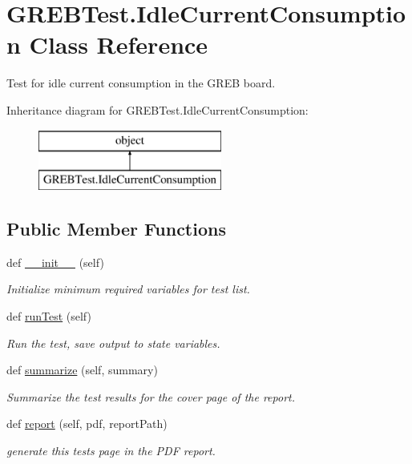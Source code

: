 \hypertarget{class_g_r_e_b_test_1_1_idle_current_consumption}{}\section{G\+R\+E\+B\+Test.\+Idle\+Current\+Consumption Class Reference}
\label{class_g_r_e_b_test_1_1_idle_current_consumption}


Test for idle current consumption in the G\+R\+EB board.  


Inheritance diagram for G\+R\+E\+B\+Test.\+Idle\+Current\+Consumption\+:\begin{figure}[H]
\begin{center}
\leavevmode
\includegraphics[height=2.000000cm]{class_g_r_e_b_test_1_1_idle_current_consumption}
\end{center}
\end{figure}
\subsection*{Public Member Functions}
\begin{DoxyCompactItemize}
\item 
def \hyperlink{class_g_r_e_b_test_1_1_idle_current_consumption_a69031fdeff95bec4109a9375b822693d}{\+\_\+\+\_\+init\+\_\+\+\_\+} (self)
\begin{DoxyCompactList}\small\item\em Initialize minimum required variables for test list. \end{DoxyCompactList}\item 
def \hyperlink{class_g_r_e_b_test_1_1_idle_current_consumption_a025d9d67ac6df090df0477c68b1dd8be}{run\+Test} (self)
\begin{DoxyCompactList}\small\item\em Run the test, save output to state variables. \end{DoxyCompactList}\item 
def \hyperlink{class_g_r_e_b_test_1_1_idle_current_consumption_a8f1c6ad70193d9795c5cb0a4d224a6ea}{summarize} (self, summary)
\begin{DoxyCompactList}\small\item\em Summarize the test results for the cover page of the report. \end{DoxyCompactList}\item 
def \hyperlink{class_g_r_e_b_test_1_1_idle_current_consumption_af0e85b6a116583cbc17294417d74b6ce}{report} (self, pdf, report\+Path)
\begin{DoxyCompactList}\small\item\em generate this test\textquotesingle{}s page in the P\+DF report. \end{DoxyCompactList}\end{DoxyCompactItemize}



